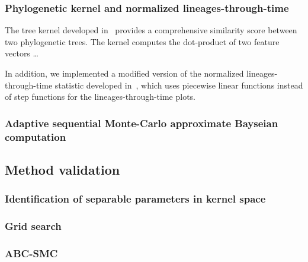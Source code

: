 \subsubsection{Phylogenetic kernel and normalized lineages-through-time}

The tree kernel developed in~\autocite{poon2013mapping} provides a
comprehensive similarity score between two phylogenetic trees. The kernel
computes the dot-product of two feature vectors \ldots

In addition, we implemented a modified version of the normalized
lineages-through-time statistic developed in~\autocite{janzen2015approximate},
which uses piecewise linear functions instead of step functions for the
lineages-through-time plots.

\subsubsection{Adaptive sequential Monte-Carlo approximate Bayseian computation}

\subsection{Method validation}

\subsubsection{Identification of separable parameters in kernel space}

\subsubsection{Grid search}

\subsubsection{ABC-SMC}
